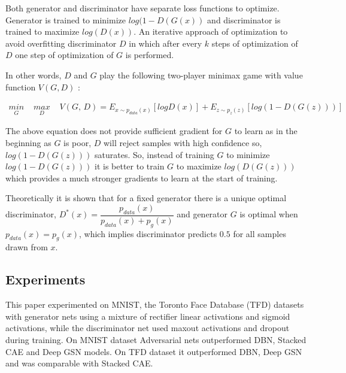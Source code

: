 \documentclass [11pt]{article}
\begin{document}
\vspace{0.5cm}

Both generator and discriminator have separate loss functions to optimize.
Generator is trained to minimize $log(1-D(G(x))$ and discriminator is trained to maximize $log(D(x))$. An iterative approach of optimization to avoid overfitting discriminator $D$ in which after every $k$ steps of optimization of $D$ one step of optimization of $G$ is performed.

\vspace{0.5cm}

In other words, $D$ and $G$ play the following two-player minimax game with value function $V(G,D)$ :


\begin{align*}
\underset{G}{min} \, & \, \underset{D}{max} \, & \, V(G,\,D)=E_{x\sim p_{data}(x)}[logD(x)]+E_{z\sim p_{z}(z)}[log(1-D(G(z)))] 
%
\end{align*}

\vspace{0.5cm}

The above equation does not provide sufficient gradient for $G$ to learn as in the beginning as $G$ is poor, $D$ will reject samples with high confidence so, $log(1-D(G(z)))$ saturates. So, instead of training $G$ to minimize $log(1-D(G(z)))$ it is better to train $G$ to maximize $log(D(G(z)))$ which provides a much stronger gradients to learn at the start of training.

\vspace{0.5cm}

Theoretically it is shown that for a fixed generator there is a unique optimal discriminator, $D^*(x) = \dfrac{p_{data}(x)}{p_{data}(x) + p_g(x)}$ and generator $G$ is optimal when $p_{data}(x) = p_g(x)$, which implies discriminator predicts $0.5$ for all samples drawn from $x$.

\vspace{0.5cm}

\subsection{Experiments} 
\hspace{1cm} This paper experimented on MNIST, the Toronto Face Database (TFD) datasets with generator nets using a mixture of rectifier linear activations and sigmoid activations, while the discriminator net used maxout activations and dropout during training.
On MNIST dataset Adversarial nets outperformed DBN, Stacked CAE and Deep GSN models. On TFD dataset it outperformed DBN, Deep GSN and was comparable with Stacked CAE.
\end{document}
